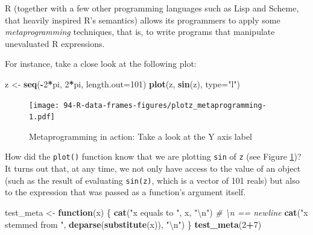\documentclass[10pt,b5paper,krantz1]{krantz}
\newenvironment{Shaded}{\begin{snugshade}}{\end{snugshade}}
\newcommand{\CharTok}[1]{\textcolor[rgb]{0.5,0.5,0.5}{#1}}
\newcommand{\CommentTok}[1]{\textcolor[rgb]{0.37,0.37,0.37}{\textit{#1}}}
\newcommand{\ControlFlowTok}[1]{\textcolor[rgb]{0.27,0.27,0.27}{\textbf{#1}}}
\newcommand{\DataTypeTok}[1]{\textcolor[rgb]{0.27,0.27,0.27}{#1}}
\newcommand{\DecValTok}[1]{\textcolor[rgb]{0.06,0.06,0.06}{#1}}
\newcommand{\KeywordTok}[1]{\textcolor[rgb]{0.27,0.27,0.27}{\textbf{#1}}}
\newcommand{\NormalTok}[1]{#1}
\newcommand{\OperatorTok}[1]{\textcolor[rgb]{0.43,0.43,0.43}{\textbf{#1}}}
\newcommand{\StringTok}[1]{\textcolor[rgb]{0.5,0.5,0.5}{#1}}
\begin{document}
R (together with a few other programming languages such as Lisp and Scheme,
that heavily inspired R's semantics) allows its programmers to apply
some \emph{metaprogramming} techniques, that is,
to write programs that manipulate unevaluated R expressions.

For instance, take a close look at the following plot:

\begin{Shaded}
\begin{Highlighting}[]
\NormalTok{z <-}\StringTok{ }\KeywordTok{seq}\NormalTok{(}\OperatorTok{-}\DecValTok{2}\OperatorTok{*}\NormalTok{pi, }\DecValTok{2}\OperatorTok{*}\NormalTok{pi, }\DataTypeTok{length.out=}\DecValTok{101}\NormalTok{)}
\KeywordTok{plot}\NormalTok{(z, }\KeywordTok{sin}\NormalTok{(z), }\DataTypeTok{type=}\StringTok{"l"}\NormalTok{)}
\end{Highlighting}
\end{Shaded}

\begin{figure}
\hypertarget{fig:plotz_metaprogramming}{%
\centering
\texttt{[image: 94-R-data-frames-figures/plotz\_metaprogramming-1.pdf]}
\caption{Metaprogramming in action: Take a look at the Y axis label}\label{fig:plotz_metaprogramming}
}
\end{figure}

How did the \texttt{plot()} function know that we are plotting \texttt{sin} of \texttt{z}
(see Figure \ref{fig:plotz_metaprogramming})?
It turns out that, at any time, we not only have access to the value
of an object (such as the result of evaluating \texttt{sin(z)}, which is
a vector of 101 reals) but also to the expression that was passed as
a function's argument itself.

\begin{Shaded}
\begin{Highlighting}[]
\NormalTok{test_meta <-}\StringTok{ }\ControlFlowTok{function}\NormalTok{(x) \{}
    \KeywordTok{cat}\NormalTok{(}\StringTok{"x equals to "}\NormalTok{, x, }\StringTok{"}\CharTok{\textbackslash{}n}\StringTok{"}\NormalTok{) }\CommentTok{# \textbackslash{}n == newline}
    \KeywordTok{cat}\NormalTok{(}\StringTok{"x stemmed from "}\NormalTok{, }\KeywordTok{deparse}\NormalTok{(}\KeywordTok{substitute}\NormalTok{(x)), }\StringTok{"}\CharTok{\textbackslash{}n}\StringTok{"}\NormalTok{)}
\NormalTok{\}}
\KeywordTok{test_meta}\NormalTok{(}\DecValTok{2}\OperatorTok{+}\DecValTok{7}\NormalTok{)}
\end{Highlighting}
\end{Shaded}
\end{document}
